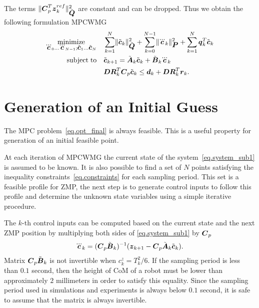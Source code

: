 The terms $\lVert \mbox{\boldmath $C$}_p^T \mbox{\boldmath $z$}_k^{ref} \rVert^2_{\tilde{\mbox{\boldmath $Q$}}}$ are constant
and can be dropped. Thus we obtain the following formulation \ac{MPCWMG}
\begin{equation}\label{eq.opt_final}
\begin{split}
\minimize{\dddot{\mbm{c}}_0 \dots \dddot{\mbm{c}}_{N-1}; \tilde{\mbm{c}}_1 \dots \tilde{\mbm{c}}_{N}}
            & \sum_{k=1}^{N}    \norm{ \tilde{\mbm{c}}_k }^2_{\tilde{\mbm{Q}}} 
            + \sum_{k=0}^{N-1}  \norm{ \dddot{\mbm{c}}_k }^2_{\mbm{P}} 
            + \sum_{k=1}^{N}    \mbm{q}_k^T \tilde{\mbm{c}}_k\\
\subjectto  & \tilde{\mbm{c}}_{k+1} = \tilde{\mbm{A}}_k\tilde{\mbm{c}}_{k} + \tilde{\mbm{B}}_k\dddot{\mbm{c}}_{k}\\
            & \mbm{D}\mbm{R}^T_k \mbm{C}_p \tilde{\mbm{c}}_k \leq \mbm{d}_{k} + \mbm{D}\mbm{R}^T_k \mbm{r}_k.
\end{split}
\end{equation}


\section{Generation of an Initial Guess}\label{sec.init_guess}
The \ac{MPC} problem~\eqref{eq.opt_final} is always feasible. This is a useful
property for generation of an initial feasible point.

At each iteration of \ac{MPCWMG} the current state of the system~\eqref{eq.system_sub1}
is assumed to be known. It is also possible to find a set of $N$ points satisfying the
inequality constraints~\eqref{eq.constraints} for each sampling period. This
set is a feasible profile for \ac{ZMP}, the next step is to generate control inputs 
to follow this profile and determine the unknown state variables using a simple
iterative procedure.

The $k$-th control inputs can be computed based on the current state and the next 
\ac{ZMP} position by multiplying both sides of \cref{eq.system_sub1} by $\mbox{\boldmath $C$}_p$
$$
\dddot{\mbm{c}}_{k} = (\mbm{C}_p\tilde{\mbm{B}}_k)^{-1} (\mbm{z}_{k+1} 
                    - \mbm{C}_p \tilde{\mbm{A}}_k\tilde{\mbm{c}}_{k}).
$$
Matrix $\mbox{\boldmath $C$}_p\tilde{\mbox{\boldmath $B$}}_k$ is not invertible when $c^z_k = T_k^2 / 6$.
If the sampling period is less than $0.1$ second, then the height of \ac{CoM} 
of a robot must be lower than approximately $2$ millimeters in order to satisfy 
this equality. Since the sampling period used in simulations and experiments is 
always below $0.1$ second, it is safe to assume that the matrix is always invertible.


